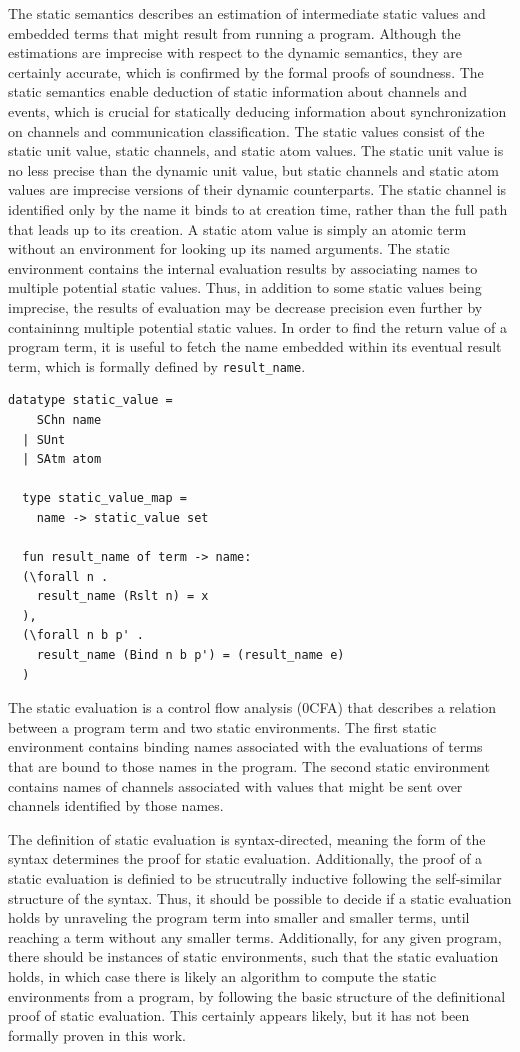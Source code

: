 \documentclass[10pt]{article}
\begin{document}
The static semantics describes an estimation of intermediate static values and embedded terms
that might result from running a program.  Although the estimations are imprecise with
respect to the dynamic semantics, they are certainly accurate,
which is confirmed by the formal proofs of soundness.
The static semantics enable deduction of static information about channels and events, which is
crucial for statically deducing information about synchronization on channels and
communication classification.
The static values consist of the static unit value, static channels, and static atom
values. The static unit value is no less precise than the dynamic unit value, but
static channels and static atom values are imprecise versions of their dynamic
counterparts. The static channel is identified only by the name it binds to at creation time,
rather than the full path that leads up to its creation.  A static atom value is simply an
atomic term without an environment for looking up its named arguments.  The static
environment contains the internal evaluation results by
associating names to multiple potential static values.
Thus, in addition to some static values being imprecise,
the results of evaluation may be decrease precision even further
by containinng multiple potential static values. 
In order to find the return value of a program term, it is useful to fetch the name
embedded within its eventual result term, which is formally defined by \lstinline{result_name}.

\begin{lstlisting}[language=logic, mathescape]
  datatype static_value =
    SChn name
  | SUnt
  | SAtm atom 

  type static_value_map =
    name -> static_value set

  fun result_name of term -> name:
  (\forall n .
    result_name (Rslt n) = x
  ),
  (\forall n b p' . 
    result_name (Bind n b p') = (result_name e)
  )
\end{lstlisting}

The static evaluation is a control flow analysis (0CFA)
that describes a relation between a program term and two static environments.
The first static environment contains binding names associated with the
evaluations of terms that are bound to those names in the program.
The second static environment contains names of channels associated
with values that might be sent over channels identified by those names.

The definition of static evaluation is syntax-directed, meaning the form of the syntax
determines the proof for static evaluation.  Additionally, the proof of a static evaluation
is definied to be strucutrally inductive following the self-similar structure of the syntax.
Thus, it should be possible to decide if a static evaluation holds
by unraveling the program term into smaller and smaller terms,
until reaching a term without any smaller terms.
Additionally, for any given program, there should be instances of static environments,
such that the static evaluation holds, in which case there is likely an
algorithm to compute the static environments from a program,
by following the basic structure of the definitional proof of static evaluation.
This certainly appears likely, but it has not been formally proven in this work.
\end{document}
